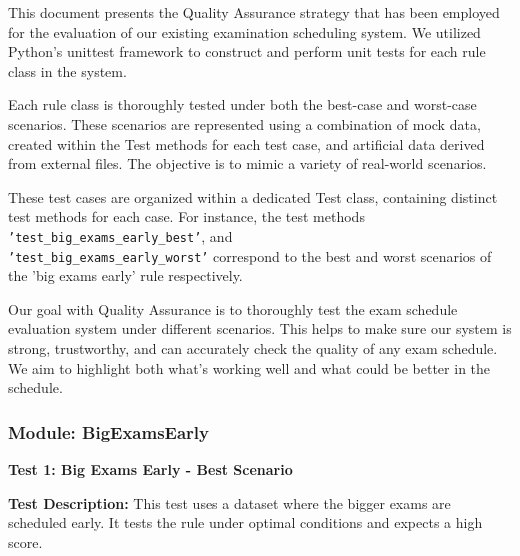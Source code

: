  This document presents the Quality Assurance strategy that has been employed for the evaluation
of our existing examination scheduling system. We utilized Python's unittest framework to
construct and perform unit tests for each rule class in the system.


\vspace{\baselineskip}

Each rule class is thoroughly tested under both the best-case and worst-case scenarios. These
scenarios are represented using a combination of mock data, created within the Test methods for
each test case, and artificial data derived from external files. The objective is to mimic a variety of
real-world scenarios.


\vspace{\baselineskip}

These test cases are organized within a dedicated Test class, containing distinct test methods for
each case. For instance, the test methods \texttt{'test\_big\_exams\_early\_best'},  and  \\ 
\texttt{'test\_big\_exams\_early\_worst'} correspond to the best and worst scenarios of the 'big exams early'
rule respectively.



\vspace{\baselineskip}

Our goal with Quality Assurance is to thoroughly test the exam schedule evaluation system under
different scenarios. This helps to make sure our system is strong, trustworthy, and can accurately
check the quality of any exam schedule. We aim to highlight both what's working well and what
could be better in the schedule.

 \subsubsection{Module: BigExamsEarly}

 
\vspace{\baselineskip}

 
 \textbf{Test 1: Big Exams Early - Best Scenario}


\vspace{\baselineskip}

 
 \textbf{Test Description:}
 This test uses a dataset where the bigger exams are scheduled early. It tests
the rule under optimal conditions and expects a high score.


\vspace{\baselineskip}


